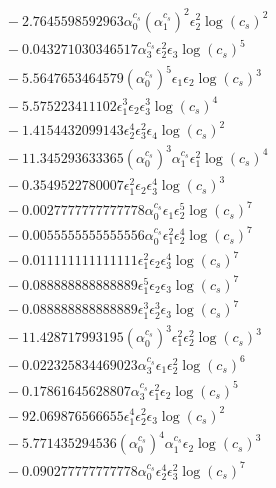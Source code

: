\documentclass[10pt]{article}
\begin{document}
\begin{align*}
&{}  - 2.7645598592963 \alpha_{0}^{c_s} \left(\alpha_{1}^{c_s}\right)^{2} \epsilon_{2}^{2} \log{\left(c_{s} \right)}^{2} \\
&{}  - 0.043271030346517 \alpha_{3}^{c_s} \epsilon_{2}^{2} \epsilon_{3} \log{\left(c_{s} \right)}^{5} \\
&{}  - 5.5647653464579 \left(\alpha_{0}^{c_s}\right)^{5} \epsilon_{1} \epsilon_{2} \log{\left(c_{s} \right)}^{3} \\
&{}  - 5.575223411102 \epsilon_{1}^{3} \epsilon_{2} \epsilon_{3}^{3} \log{\left(c_{s} \right)}^{4} \\
&{}  - 1.4154432099143 \epsilon_{2}^{4} \epsilon_{3}^{2} \epsilon_{4} \log{\left(c_{s} \right)}^{2} \\
&{}  - 11.345293633365 \left(\alpha_{0}^{c_s}\right)^{3} \alpha_{1}^{c_s} \epsilon_{1}^{2} \log{\left(c_{s} \right)}^{4} \\
&{}  - 0.3549522780007 \epsilon_{1}^{2} \epsilon_{2} \epsilon_{3}^{4} \log{\left(c_{s} \right)}^{3} \\
&{}  - 0.0027777777777778 \alpha_{0}^{c_s} \epsilon_{1} \epsilon_{2}^{5} \log{\left(c_{s} \right)}^{7} \\
&{}  - 0.0055555555555556 \alpha_{0}^{c_s} \epsilon_{1}^{2} \epsilon_{2}^{4} \log{\left(c_{s} \right)}^{7} \\
&{}  - 0.011111111111111 \epsilon_{1}^{2} \epsilon_{2} \epsilon_{3}^{4} \log{\left(c_{s} \right)}^{7} \\
&{}  - 0.088888888888889 \epsilon_{1}^{5} \epsilon_{2} \epsilon_{3} \log{\left(c_{s} \right)}^{7} \\
&{}  - 0.088888888888889 \epsilon_{1}^{3} \epsilon_{2}^{3} \epsilon_{3} \log{\left(c_{s} \right)}^{7} \\
&{}  - 11.428717993195 \left(\alpha_{0}^{c_s}\right)^{3} \epsilon_{1}^{2} \epsilon_{2}^{2} \log{\left(c_{s} \right)}^{3} \\
&{}  - 0.022325834469023 \alpha_{3}^{c_s} \epsilon_{1} \epsilon_{2}^{2} \log{\left(c_{s} \right)}^{6} \\
&{}  - 0.17861645628807 \alpha_{3}^{c_s} \epsilon_{1}^{2} \epsilon_{2} \log{\left(c_{s} \right)}^{5} \\
&{}  - 92.069876566655 \epsilon_{1}^{4} \epsilon_{2}^{2} \epsilon_{3} \log{\left(c_{s} \right)}^{2} \\
&{}  - 5.771435294536 \left(\alpha_{0}^{c_s}\right)^{4} \alpha_{1}^{c_s} \epsilon_{2} \log{\left(c_{s} \right)}^{3} \\
&{}  - 0.090277777777778 \alpha_{0}^{c_s} \epsilon_{2}^{4} \epsilon_{3}^{2} \log{\left(c_{s} \right)}^{7} \\

\end{align*}
\end{document}
